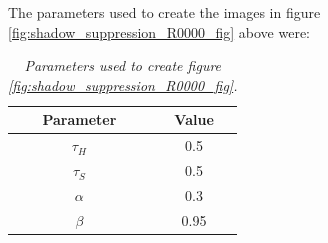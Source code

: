 The parameters used to create the images in figure \ref{fig:shadow_suppression_R0000_fig} above were:

\begin{table}[htb]
\centering
\begin{tabular}{|c|c|}
	\hline
	Parameter & Value  \\
	\hline
	$\tau_H$ &  0.5 \\
	\hline
	$\tau_S$ & 0.5 \\
	\hline
	$\alpha$ &  0.3 \\
	\hline
	$\beta$ &  0.95 \\
	\hline
\end{tabular}

\caption{\textit{Parameters used to create figure \ref{fig:shadow_suppression_R0000_fig}.}}
\label{tab:shadow_parameters_R0000}
\end{table}
